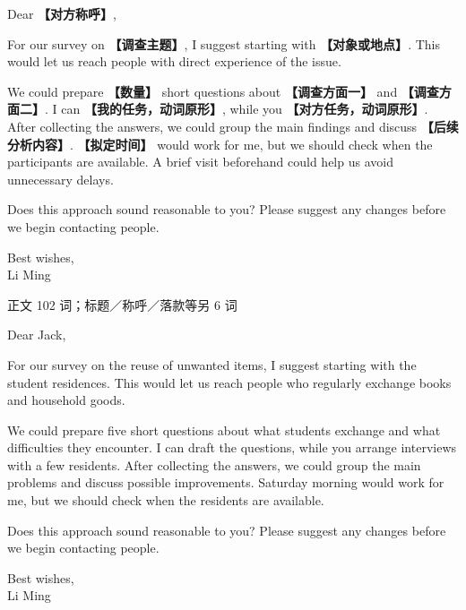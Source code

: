 \documentclass[11pt,a4paper,fontset=macnew]{ctexart}
\newenvironment{writing}{\begingroup\fontsize{10.5}{13.5}\selectfont\setlength{\parskip}{3pt}}{\par\endgroup}
\newenvironment{example}{\begingroup\fontsize{11}{14.3}\selectfont\setlength{\parskip}{4pt}}{\par\endgroup}
\begin{document}
\begin{writing}
\noindent Dear {\bfseries 【对方称呼】},\par
For our survey on {\bfseries 【调查主题】}, I suggest starting with {\bfseries 【对象或地点】}. This would let us reach people with direct experience of the issue.

We could prepare {\bfseries 【数量】} short questions about {\bfseries 【调查方面一】} and {\bfseries 【调查方面二】}. I can {\bfseries 【我的任务，动词原形】}, while you {\bfseries 【对方任务，动词原形】}. After collecting the answers, we could group the main findings and discuss {\bfseries 【后续分析内容】}. {\bfseries 【拟定时间】} would work for me, but we should check when the participants are available. A brief visit beforehand could help us avoid unnecessary delays.

Does this approach sound reasonable to you? Please suggest any changes before we begin contacting people.

\noindent Best wishes,\\Li Ming\par
\end{writing}
\par\vspace{4pt}{\bfseries 完整套用示例}\par\nopagebreak
{\small 正文 102 词；标题／称呼／落款等另 6 词}\par
\begin{example}
\noindent Dear Jack,\par
For our survey on the reuse of unwanted items, I suggest starting with the student residences. This would let us reach people who regularly exchange books and household goods.

We could prepare five short questions about what students exchange and what difficulties they encounter. I can draft the questions, while you arrange interviews with a few residents. After collecting the answers, we could group the main problems and discuss possible improvements. Saturday morning would work for me, but we should check when the residents are available.

Does this approach sound reasonable to you? Please suggest any changes before we begin contacting people.

\noindent Best wishes,\\Li Ming\par
\end{example}
\par\vspace{4pt}{\bfseries 好词好句：优先记这三处}\par\nopagebreak
\end{document}
